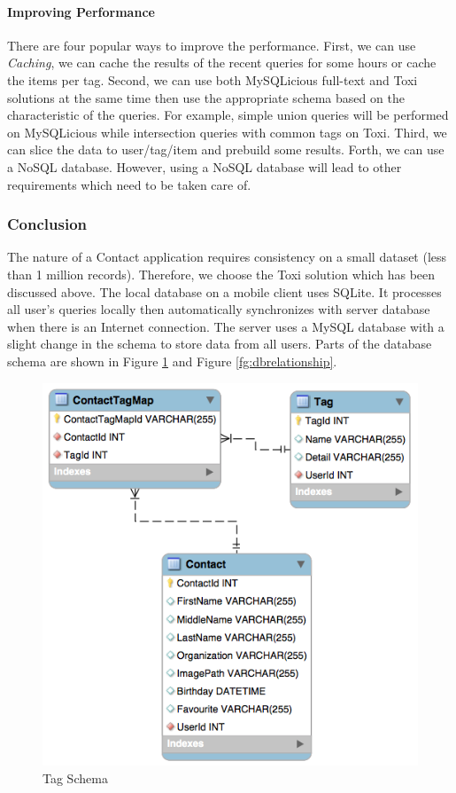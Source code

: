 \paragraph{Improving Performance}
There are four popular ways to improve the performance. First, we can use \textit{Caching}, we can cache the results of the recent queries for some hours or cache the items per tag. Second, we can use both MySQLicious full-text and Toxi solutions at the same time then use the appropriate schema based on the characteristic of the queries. For example, simple union queries will be performed on MySQLicious while intersection queries with common tags on Toxi. Third, we can slice the data to user/tag/item and prebuild some results. Forth, we can use a NoSQL database. However, using a NoSQL database will lead to other requirements which need to be taken care of.

\subsubsection{Conclusion}
The nature of a Contact application requires consistency on a small dataset (less than 1 million records). Therefore, we choose the Toxi \cite{toxi} solution which has been discussed above. The local database on a mobile client uses SQLite. It processes all user's queries locally then automatically synchronizes with server database when there is an Internet connection. The server uses a MySQL database with a slight change in the schema to store data from all users. Parts of the database schema are shown in Figure \ref{fg:dbtag} and Figure \ref{fg:dbrelationship}.

\begin{figure}[!h]
\begin{centering}
\includegraphics[scale=0.55]{pics/dbtag}
\caption{Tag Schema}\label{fg:dbtag}
\end{centering}
\end{figure}

